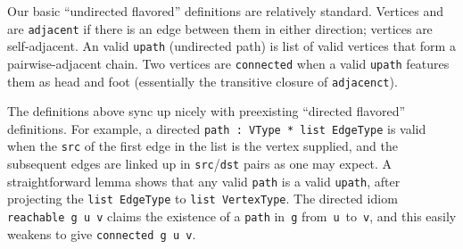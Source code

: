 


Our basic ``undirected flavored'' definitions are
relatively standard.
Vertices  and  are \texttt{adjacent} if there is
an edge between them in either direction; vertices are self-adjacent.
An valid \texttt{upath} (undirected path) is list of
valid vertices that form a
pairwise-adjacent chain. Two vertices are \texttt{connected} when a valid \texttt{upath}
features them as head and foot (essentially the transitive
closure of \texttt{adjacenct}).

The definitions above sync up nicely with preexisting ``directed
flavored'' definitions.
For example, a directed \texttt{path~: VType~* list~EdgeType}
is valid when the \texttt{src} of the first edge in the list
is the vertex supplied, and the subsequent edges are linked up
in \texttt{src}/\texttt{dst} pairs
as one may expect. A straightforward lemma shows that
any valid \texttt{path} is a valid \texttt{upath}, after projecting the
\texttt{list EdgeType} to \texttt{list VertexType}.
The directed idiom \texttt{reachable~g~u~v} claims the
existence of a \texttt{path} in~\texttt{g} from~\texttt{u}~to~\texttt{v},
and this easily weakens to give \texttt{connected~g~u~v}.

